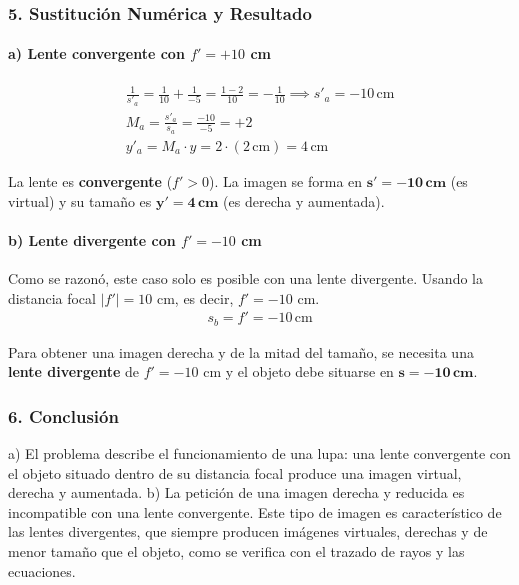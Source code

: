 \subsubsection*{5. Sustitución Numérica y Resultado}
\paragraph*{a) Lente convergente con $f'=+10$ cm}
\begin{gather}
    \frac{1}{s'_a} = \frac{1}{10} + \frac{1}{-5} = \frac{1-2}{10} = -\frac{1}{10} \implies s'_a = -10 \, \text{cm} \\
    M_a = \frac{s'_a}{s_a} = \frac{-10}{-5} = +2 \\
    y'_a = M_a \cdot y = 2 \cdot (2 \, \text{cm}) = 4 \, \text{cm}
\end{gather}
\begin{cajaresultado}
    La lente es \textbf{convergente} ($f'>0$). La imagen se forma en $\boldsymbol{s'=-10 \, cm}$ (es virtual) y su tamaño es $\boldsymbol{y'=4 \, cm}$ (es derecha y aumentada).
\end{cajaresultado}

\paragraph*{b) Lente divergente con $f'=-10$ cm}
Como se razonó, este caso solo es posible con una lente divergente. Usando la distancia focal $|f'|=10$ cm, es decir, $f'=-10$ cm.
\begin{gather}
    s_b = f' = -10 \, \text{cm}
\end{gather}
\begin{cajaresultado}
    Para obtener una imagen derecha y de la mitad del tamaño, se necesita una \textbf{lente divergente} de $f'=-10$ cm y el objeto debe situarse en $\boldsymbol{s = -10 \, cm}$.
\end{cajaresultado}

\subsubsection*{6. Conclusión}
\begin{cajaconclusion}
a) El problema describe el funcionamiento de una lupa: una lente convergente con el objeto situado dentro de su distancia focal produce una imagen virtual, derecha y aumentada. b) La petición de una imagen derecha y reducida es incompatible con una lente convergente. Este tipo de imagen es característico de las lentes divergentes, que siempre producen imágenes virtuales, derechas y de menor tamaño que el objeto, como se verifica con el trazado de rayos y las ecuaciones.
\end{cajaconclusion}

